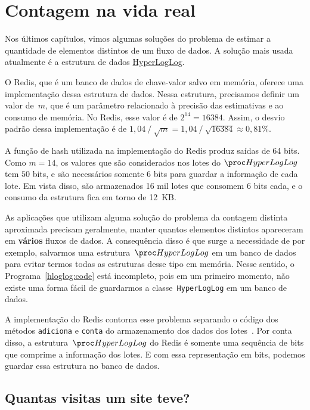 \chapter{Contagem na vida real}

Nos últimos capítulos, vimos algumas soluções do problema de estimar a quantidade de elementos distintos de um fluxo de
dados. A solução mais usada atualmente é a estrutura de dados \hyperref[sec:loglog:hyperloglog]{HyperLogLog}. 

O Redis, que é um banco de dados de chave-valor salvo em memória, oferece uma implementação dessa estrutura de dados. 
Nessa estrutura, precisamos definir um valor de~$m$, que é um parâmetro relacionado à precisão das estimativas e ao 
consumo de memória. No Redis, esse valor é de $2^{14} = 16384$. Assim, o desvio padrão dessa implementação é de 
$1{,}04 \mathbin{/} \sqrt{m} = 1{,}04 \mathbin{/} \sqrt{16384} \approx 0{,}81\%$.

A função de hash utilizada na implementação do Redis produz saídas de 64 bits. Como $m = 14$, os valores que são 
considerados nos lotes do $\HLOG$ tem $50$ bits, e são necessários somente $6$ bits para guardar a informação de cada 
lote. Em vista disso, são armazenados 16 mil lotes que consomem 6 bits cada, e o consumo da estrutura fica em torno de 
12~KB.

As aplicações que utilizam alguma solução do problema da contagem distinta aproximada precisam geralmente, manter 
quantos elementos distintos apareceram em \textbf{vários} fluxos de dados. A consequência disso é que surge a 
necessidade de por exemplo, salvarmos uma estrutura~$\HLOG$ em um banco de dados para evitar termos todas as estruturas 
desse tipo em memória. Nesse sentido, o Programa~\ref{hloglog:code} está incompleto, pois em um primeiro momento, não 
existe uma forma fácil de guardarmos a classe~\texttt{HyperLogLog} em um banco de dados.

A implementação do Redis contorna esse problema separando o código dos métodos \texttt{adiciona} e \texttt{conta} do 
armazenamento dos dados dos lotes~\citep{HyperLogLogDetails}. Por conta disso, a estrutura~$\HLOG$ do Redis é somente 
uma sequência de bits que comprime a informação dos lotes. E com essa representação em bits, podemos guardar essa 
estrutura no banco de dados.

\section{Quantas visitas um site teve?}

